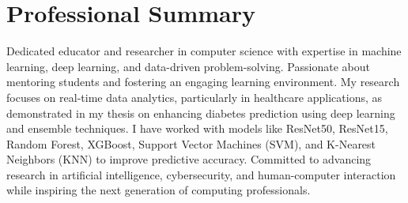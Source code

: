 \section{\textbf{Professional Summary}}
\vspace{1mm}
\small{
Dedicated educator and researcher in computer science with expertise in machine learning, deep learning, and data-driven problem-solving. Passionate about mentoring students and fostering an engaging learning environment. My research focuses on real-time data analytics, particularly in healthcare applications, as demonstrated in my thesis on enhancing diabetes prediction using deep learning and ensemble techniques. I have worked with models like ResNet50, ResNet15, Random Forest, XGBoost, Support Vector Machines (SVM), and K-Nearest Neighbors (KNN) to improve predictive accuracy. Committed to advancing research in artificial intelligence, cybersecurity, and human-computer interaction while inspiring the next generation of computing professionals.
}
